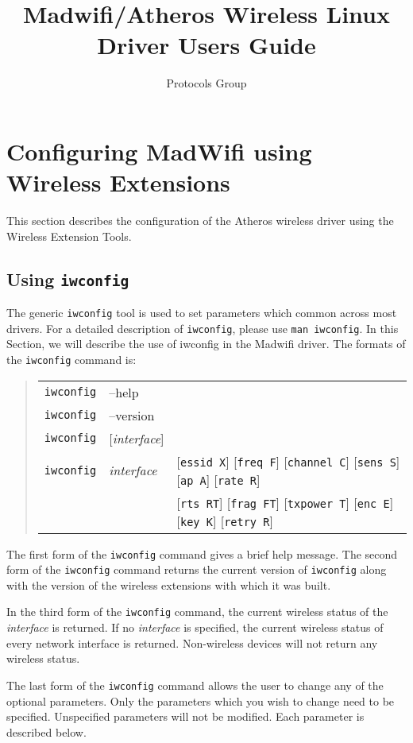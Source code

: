 \documentclass[10pt,fullpage]{article}
\newcommand{\mytt}[1]{{\texttt{#1}}}
\newcommand{\bv}{\begin{verse}}
\newcommand{\ev}{\end{verse}}
\begin{document}
\title{Madwifi/Atheros Wireless Linux Driver Users Guide}
\author{Protocols Group}
\maketitle
\tableofcontents
\section{Configuring MadWifi using Wireless Extensions}
This section describes the configuration of the Atheros wireless
driver using the Wireless Extension Tools.

\subsection{Using \mytt{iwconfig}}
The generic \mytt{iwconfig} tool is used to set parameters which
common across most drivers.  For a detailed description of
\mytt{iwconfig}, please use \mytt{man iwconfig}.  In this Section, we
will describe the use of iwconfig in the Madwifi driver.  The formats
of the \mytt{iwconfig} command is:
\bv
\begin{tabular}{lll}
\mytt{iwconfig} & --help & \\
\mytt{iwconfig} & --version & \\
\mytt{iwconfig} & [\textit{interface}] & \\
\mytt{iwconfig} & \textit{interface} & [\mytt{essid X}] [\mytt{freq
  F}] [\mytt{channel C}] [\mytt{sens S}] [\mytt{ap A}] [\mytt{rate R}]
\\
& & [\mytt{rts RT}] [\mytt{frag FT}] [\mytt{txpower T}] [\mytt{enc E}] [\mytt{key K}] [\mytt{retry R}]\\
\end{tabular}
\ev

The first form of the \mytt{iwconfig} command gives a brief help
message. The second form of the \mytt{iwconfig} command returns the
current version of \mytt{iwconfig} along with the version of the
wireless extensions with which it was built.

In the third form of the \mytt{iwconfig} command, the current wireless
status of the \textit{interface} is returned.  If no
\textit{interface} is specified, the current wireless status of every
network interface is returned.  Non-wireless devices will not return
any wireless status.

The last form of the \mytt{iwconfig} command allows the user to change
any of the optional parameters. Only the parameters which you wish to
change need to be specified.  Unspecified parameters will not be
modified.  Each parameter is described below.
\end{document}
